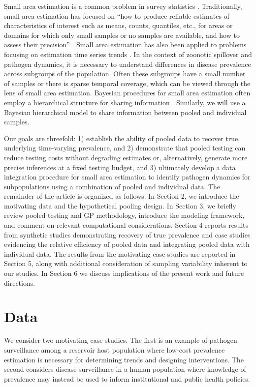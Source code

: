 \documentclass{article}
\begin{document}
Small area estimation is a common problem in survey statistics \cite{ghosh1994small}. Traditionally, small area estimation has focused on ``how to produce reliable estimates of characteristics of interest such as means, counts, quantiles, etc., for areas or domains for which only small samples or no samples are available, and how to assess their precision'' \cite{pfeffermann2013new}. Small area estimation has also been applied to problems focusing on estimation time series trends \cite{rao1994small}.  In the context of zoonotic spillover and pathogen dynamics, it is necessary to understand differences in disease prevalence across subgroups of the population. Often these subgroups have a small number of samples or there is sparse temporal coverage, which can be viewed through the lens of small area estimation. Bayesian procedures for small area estimation often employ a hierarchical structure for sharing information \cite{molina2014small, datta2011bayesian}. Similarly, we will use a Bayesian hierarchical model to share information between pooled and individual samples.

Our goals are threefold: 1) establish the ability of pooled data to recover true, underlying time-varying prevalence, and 2) demonstrate that pooled testing can reduce testing costs without degrading estimates or, alternatively, generate more precise inferences at a fixed testing budget, and 3) ultimately develop a data integration procedure for small area estimation to identify pathogen dynamics for subpopulations using a combination of pooled and individual data. The remainder of the article is organized as follows. In Section 2, we introduce the motivating data and the hypothetical pooling design. In Section 3, we briefly review pooled testing and GP methodology, introduce the modeling framework, and comment on relevant computational considerations. Section 4 reports results from synthetic studies demonstrating recovery of true prevalence and case studies evidencing the relative efficiency of pooled data and integrating pooled data with individual data. The results from the motivating case studies are reported in Section 5, along with additional consideration of sampling variability inherent to our studies. In Section 6 we discuss implications of the present work and future directions.  

\section{Data}

We consider two motivating case studies. The first is an example of pathogen surveillance among a reservoir host population where low-cost prevalence estimation is necessary for determining trends and designing interventions. The second considers disease surveillance in a human population where knowledge of prevalence may instead be used to inform institutional and public health policies.  
\end{document}
